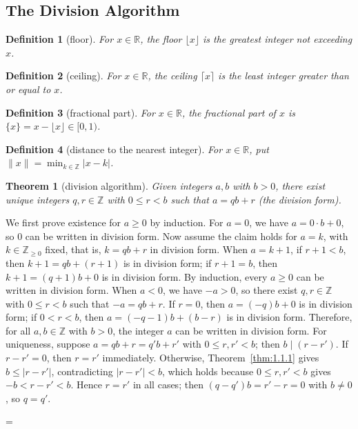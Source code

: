 \documentclass[11pt]{article}
\makeatletter
\theoremstyle{ntstyle}
\newtheorem{theorem}{Theorem}[subsection]
\newtheorem{definition}{Definition}[subsection]
\let\nt@closedisplay\]
\def\nt@guardedclose{\@ifnextchar\par{\nt@closeafterpar}{\@ifnextchar\end{\postdisplaypenalty\@M\nt@closedisplay}{\nt@closedisplay}}}
\def\nt@closeafterpar\par{\@ifnextchar\par{\nt@closeafterpar}{\@ifnextchar\end{\postdisplaypenalty\@M\nt@closedisplay\par}{\nt@closedisplay\par}}}
\renewenvironment{proof}[1][\proofname]{\par
  \pushQED{\qed}\normalfont\topsep\medskipamount\edef\nt@afterproof{\@endparpenalty=\the\@endparpenalty\relax}\@beginparpenalty\@M\@endparpenalty\@M\let\]\nt@guardedclose\trivlist\item[]\textit{#1\@addpunct{.}} \ignorespaces}{\ifvmode\addpenalty\@M\fi\popQED\nt@afterproof\endtrivlist\@endpefalse}
\makeatother
\begin{document}
\subsection{The Division Algorithm}

\begin{definition}[floor]\label{def:1.2.1} For $x\in\mathbb{R}$, the floor $\lfloor x\rfloor$ is the greatest integer
	not exceeding $x$.

\end{definition}
\begin{definition}[ceiling]\label{def:1.2.2} For $x\in\mathbb{R}$,
	the ceiling $\lceil x\rceil$ is the least integer greater than or equal to $x$.

\end{definition}
\begin{definition}[fractional part]\label{def:1.2.3} For
	$x\in\mathbb{R}$, the fractional part of $x$ is
	$\{x\}=x-\lfloor x\rfloor\in[0,1)$.

\end{definition}
\begin{definition}[distance to the nearest integer]\label{def:1.2.4}
	For $x\in\mathbb{R}$, put
	$\lVert x\rVert=\min_{k\in\mathbb{Z}}|x-k|$.

\end{definition}
\begin{theorem}[division algorithm]\label{thm:1.2.1} Given integers
	$a, b$ with $b > 0$, there exist unique integers $q, r \in \mathbb{Z}$
	with $0 \le r < b$ such that $a = qb + r$ (the division form).

\end{theorem}

\begin{proof} We first prove existence for $a\ge0$ by induction. For $a = 0$, we have $a = 0
		\cdot b + 0$, so $0$ can be written in division form. Now
	assume the claim holds for $a = k$, with $k \in \mathbb{Z}_{\ge0}$ fixed, that is, $k = qb + r$ in division form. When $a = k+1$,
	if $r + 1 < b$, then $k+1 = qb + (r+1)$ is in division form; if $r+1
		= b$, then $k+1 = (q+1)b + 0$ is in division form. By induction,
	every $a \ge 0$ can be written in division form. When $a < 0$, we
	have $-a > 0$, so there exist $q, r \in \mathbb{Z}$ with $0 \le r <
		b$ such that $-a = qb + r$. If $r = 0$, then $a = (-q)b + 0$ is in
	division form; if $0 < r < b$, then $a = (-q-1)b + (b - r)$ is in
	division form. Therefore, for all $a, b \in \mathbb{Z}$ with $b > 0$,
	the integer $a$ can be written in division form. For uniqueness, suppose $a = qb
		+ r = q'b + r'$ with $0 \le r, r' < b$; then $b \mid (r-r')$. If $r-r'=0$, then $r=r'$ immediately. Otherwise, Theorem~\ref{thm:1.1.1} gives $b\le |r-r'|$, contradicting $|r-r'|<b$, which holds because $0\le r,r'<b$ gives $-b<r-r'<b$. Hence $r=r'$ in all cases; then $(q-q')b=r'-r=0$ with $b\neq0$, so $q=q'$.

\end{proof}
\newpage
\end{document}
